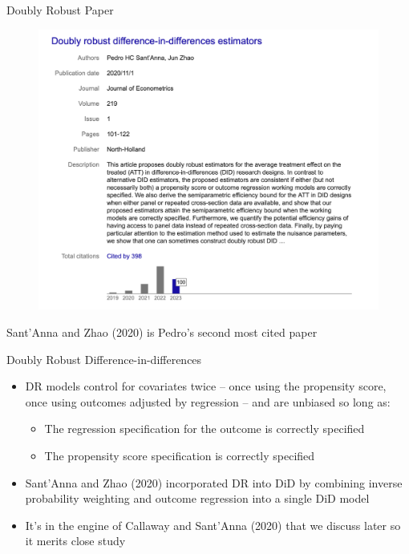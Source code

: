 \documentclass{beamer}
\begin{document}
\begin{frame}{Doubly Robust Paper}

	\begin{figure}
	\includegraphics[scale=0.25]{./lecture_includes/pedro_dr_cites}
	\end{figure}Sant'Anna and Zhao (2020) is Pedro's second most cited paper

\end{frame}




\begin{frame}{Doubly Robust Difference-in-differences}

\begin{itemize}
\item DR models control for covariates twice -- once using the propensity score, once using outcomes adjusted by regression -- and are unbiased so long as:
	\begin{itemize}
	\item The regression specification for the outcome is correctly specified
	\item The propensity score specification is correctly specified
	\end{itemize}
\item Sant'Anna and Zhao (2020) incorporated DR into DiD by combining inverse probability weighting and outcome regression into a single DiD model
\item It's in the engine of Callaway and Sant'Anna (2020) that we discuss later so it merits close study
\end{itemize}

\end{frame}
\end{document}

